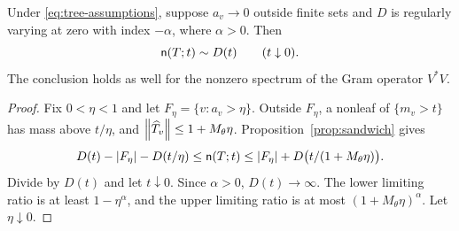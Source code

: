 \begin{theorem}\label{thm:transfer}
Under \eqref{eq:tree-assumptions}, suppose $a_v\to0$ outside finite sets
and $D$ is regularly varying at zero with index $-\alpha$, where $\alpha>0$.
Then
\[
 \mathsf n(T;t)\sim D(t)\qquad(t\downarrow0).
\]
The conclusion holds as well for the nonzero spectrum of the Gram operator
$V^*V$.
\end{theorem}
\begin{proof}
Fix $0<\eta<1$ and let $F_\eta=\{v:a_v>\eta\}$.
Outside $F_\eta$, a nonleaf of $\{m_v>t\}$ has mass above $t/\eta$, and
$\left\lVert \widehat T_v\right\rVert\le1+M_\theta\eta$. Proposition~\ref{prop:sandwich} gives
\[
 D(t)-|F_\eta|-D(t/\eta)
 \le\mathsf n(T;t)
 \le |F_\eta|+D\bigl(t/(1+M_\theta\eta)\bigr).
\]
Divide by $D(t)$ and let $t\downarrow0$. Since $\alpha>0$, $D(t)\to\infty$.
The lower limiting ratio is at least $1-\eta^\alpha$, and the upper
limiting ratio is at most $(1+M_\theta\eta)^\alpha$. Let $\eta\downarrow0$.
\end{proof}

